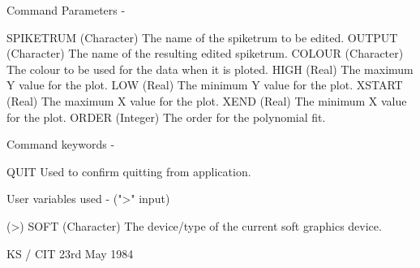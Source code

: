 \begin{description}
\begin{terminalv}
 Command Parameters -

 SPIKETRUM    (Character) The name of the spiketrum to be
              edited.
 OUTPUT       (Character) The name of the resulting edited
              spiketrum.
 COLOUR       (Character) The colour to be used for the data
              when it is ploted.
 HIGH         (Real) The maximum Y value for the plot.
 LOW          (Real) The minimum Y value for the plot.
 XSTART       (Real) The maximum X value for the plot.
 XEND         (Real) The minimum X value for the plot.
 ORDER        (Integer) The order for the polynomial fit.

 Command keywords -

 QUIT         Used to confirm quitting from application.

 User variables used -    (">" input)

 (>) SOFT     (Character) The device/type of the current soft
              graphics device.

                                    KS / CIT 23rd May 1984
\end{terminalv}
\end{description}
